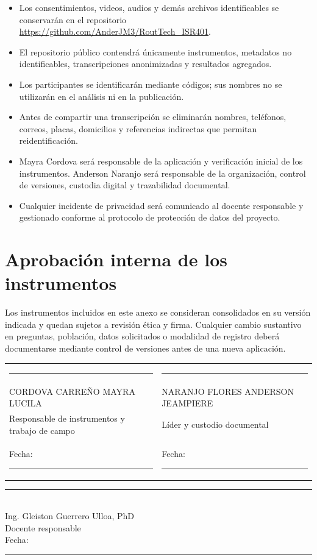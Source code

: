 \documentclass[10pt,a4paper]{article}
\newcommand{\Docente}{Ing. Gleiston Guerrero Ulloa, PhD}
\newcommand{\Anderson}{NARANJO FLORES ANDERSON JEAMPIERE}
\newcommand{\Mayra}{CORDOVA CARREÑO MAYRA LUCILA}
\begin{document}
\begin{itemize}
  \item Los consentimientos, videos, audios y demás archivos identificables se conservarán en el repositorio \url{https://github.com/AnderJM3/RoutTech_ISR401}.
  \item El repositorio público contendrá únicamente instrumentos, metadatos no identificables, transcripciones anonimizadas y resultados agregados.
  \item Los participantes se identificarán mediante códigos; sus nombres no se utilizarán en el análisis ni en la publicación.
  \item Antes de compartir una transcripción se eliminarán nombres, teléfonos, correos, placas, domicilios y referencias indirectas que permitan reidentificación.
  \item Mayra Cordova será responsable de la aplicación y verificación inicial de los instrumentos. Anderson Naranjo será responsable de la organización, control de versiones, custodia digital y trazabilidad documental.
  \item Cualquier incidente de privacidad será comunicado al docente responsable y gestionado conforme al protocolo de protección de datos del proyecto.
\end{itemize}

\section{Aprobación interna de los instrumentos}

Los instrumentos incluidos en este anexo se consideran consolidados en su versión indicada y quedan sujetos a revisión ética y firma. Cualquier cambio sustantivo en preguntas, población, datos solicitados o modalidad de registro deberá documentarse mediante control de versiones antes de una nueva aplicación.

\vspace{1.1cm}
\noindent\begin{tabularx}{\textwidth}{Y Y}
\centering\rule{6.1cm}{0.4pt} & \centering\arraybackslash\rule{6.1cm}{0.4pt}\\
\centering \Mayra & \centering\arraybackslash \Anderson\\
\centering Responsable de instrumentos y trabajo de campo & \centering\arraybackslash Líder y custodio documental\\[5pt]
\centering Fecha: \rule{2.7cm}{0.4pt} & \centering\arraybackslash Fecha: \rule{2.7cm}{0.4pt}
\end{tabularx}

\vspace{1.15cm}
\begin{center}
\rule{7.0cm}{0.4pt}\\
\Docente\\
Docente responsable\\[5pt]
Fecha: \rule{3.0cm}{0.4pt}
\end{center}
\end{document}
